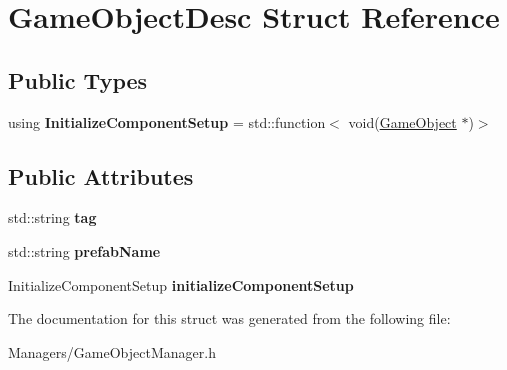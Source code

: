 \hypertarget{structGameObjectDesc}{}\section{Game\+Object\+Desc Struct Reference}
\label{structGameObjectDesc}
\subsection*{Public Types}
\begin{DoxyCompactItemize}
\item 
\mbox{\label{structGameObjectDesc_aa55e1f89cdd761bf046cf6ee18d847ab}} 
using {\bfseries Initialize\+Component\+Setup} = std\+::function$<$ void(\hyperlink{classGameObject}{Game\+Object} $\ast$)$>$
\end{DoxyCompactItemize}
\subsection*{Public Attributes}
\begin{DoxyCompactItemize}
\item 
\mbox{\label{structGameObjectDesc_a2bc7ae1aa92483492a6c5459af99267b}} 
std\+::string {\bfseries tag}
\item 
\mbox{\label{structGameObjectDesc_a2ccd0952107fff3b7f7973ba5aa14676}} 
std\+::string {\bfseries prefab\+Name}
\item 
\mbox{\label{structGameObjectDesc_a0efb2764311a0e433d929362dcab57d0}} 
Initialize\+Component\+Setup {\bfseries initialize\+Component\+Setup}
\end{DoxyCompactItemize}


The documentation for this struct was generated from the following file\+:\begin{DoxyCompactItemize}
\item 
Managers/Game\+Object\+Manager.\+h\end{DoxyCompactItemize}
